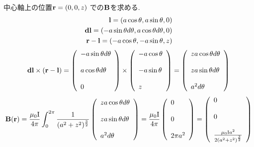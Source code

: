 \documentclass[../main]{subfiles}
\begin{document}
中心軸上の位置${\bf r} = (0,0,z)$ での${\bf B}$を求める.
\begin{eqnarray*}
{\bf l} = (a \cos\theta,a\sin\theta,0) \\
{\bf dl} = (-a \sin \theta d\theta,a \cos \theta d\theta,0) \\
{\bf r}-{\bf l}=(-a \cos\theta,-a\sin\theta,z) \\
\end{eqnarray*}
\begin{eqnarray*}
{\bf dl} \times ({\bf r}-{\bf l}) = \left(
\begin{array}{l}
-a \sin \theta d\theta \\
\\
a \cos \theta d\theta \\
\\
0
\end{array}
\right)
\times
\left(
\begin{array}{l}
-a \cos\theta \\
\\
-a\sin\theta \\
\\
z
\end{array}
\right)
=
\left(
\begin{array}{l}
za \cos\theta d\theta \\
\\
za \sin\theta d\theta \\
\\
a^2 d\theta
\end{array}
\right)
\end{eqnarray*}
\begin{eqnarray*}
{\bf B}({\bf r})=\frac{\mu_0 {\rm I}}{4 \pi} \int_{0}^{2 \pi} \frac{1}{(a^2+z^2)^{\frac{3}{2}}}
\left(
\begin{array}{l}
za \cos\theta d\theta \\
\\
za \sin\theta d\theta \\
\\
a^2 d\theta
\end{array}
\right)
=
\frac{\mu_0 {\rm I}}{4 \pi}
\left(
\begin{array}{l}
0 \\
\\
0 \\
\\
2 \pi a^2
\end{array}
\right)
=
\left(
\begin{array}{l}
0 \\
\\
0 \\
\\
\frac{\mu_0 {\rm I}a^2}{2 (a^2+z^2)^{\frac{3}{2}} }
\end{array}
\right)
\end{eqnarray*}
\end{document}
